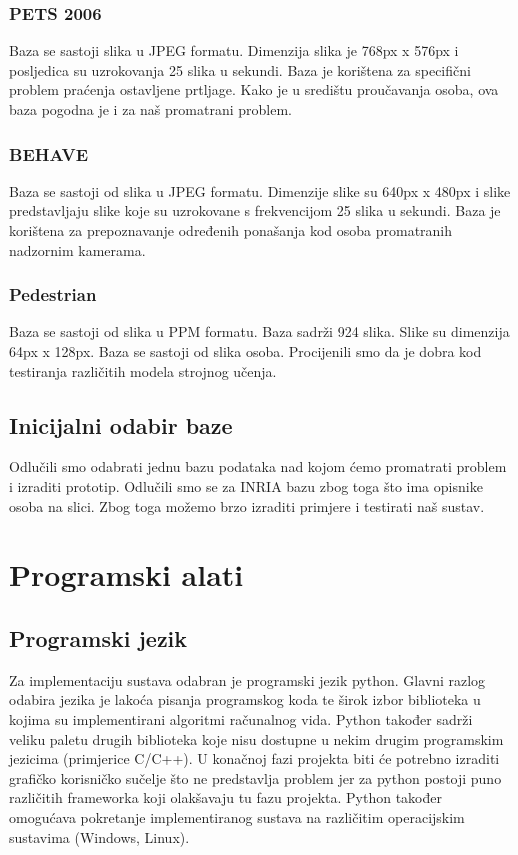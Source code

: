 \documentclass[times, utf8, seminar, numeric]{fer}
\begin{document}
\subsection{PETS 2006}

Baza se sastoji slika u JPEG formatu. Dimenzija slika je 768px x 576px i
posljedica su uzrokovanja 25 slika u sekundi. Baza je korištena za specifični 
problem praćenja ostavljene prtljage. Kako je u središtu proučavanja osoba, ova
baza pogodna je i za naš promatrani problem.

\subsection{BEHAVE}

Baza se sastoji od slika u JPEG formatu. Dimenzije slike su 640px x 480px i
slike predstavljaju slike koje su uzrokovane s frekvencijom 25 slika u sekundi.
Baza je korištena za prepoznavanje određenih ponašanja kod osoba promatranih 
nadzornim kamerama.  

\subsection{Pedestrian}

Baza se sastoji od slika u PPM formatu. Baza sadrži 924 slika. 
Slike su dimenzija 64px x 128px. Baza se sastoji od slika osoba. Procijenili 
smo da je dobra kod testiranja različitih modela strojnog učenja.

\section{Inicijalni odabir baze}

Odlučili smo odabrati jednu 
bazu podataka nad kojom ćemo promatrati problem i izraditi prototip. Odlučili
smo se za INRIA bazu zbog toga što ima opisnike osoba na slici. Zbog toga
možemo brzo izraditi primjere i testirati naš sustav.

\chapter{Programski alati}

\section{Programski jezik}
Za implementaciju sustava odabran je programski jezik python. Glavni razlog odabira jezika je lakoća pisanja programskog koda te širok izbor biblioteka u kojima su implementirani algoritmi računalnog vida. Python također sadrži veliku paletu drugih biblioteka koje nisu dostupne u nekim drugim programskim jezicima (primjerice C/C++). U konačnoj fazi projekta biti će potrebno izraditi grafičko korisničko sučelje što ne predstavlja problem jer za python postoji puno različitih frameworka koji olakšavaju tu fazu projekta. Python također omogućava pokretanje implementiranog sustava na različitim operacijskim sustavima (Windows, Linux).
\end{document}

